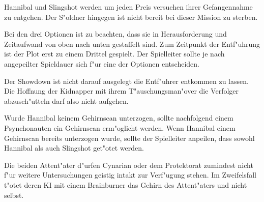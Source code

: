 Hannibal und Slingshot werden um jeden Preis versuchen ihrer Gefangennahme zu entgehen. Der S"oldner hingegen ist nicht bereit bei dieser Mission zu sterben.

\begin{remarks}
	Bei den drei Optionen ist zu beachten, dass sie in Herausforderung und Zeitaufwand von oben nach unten gestaffelt sind. Zum Zeitpunkt der Entf"uhrung ist der Plot erst zu einem Drittel gespielt. Der Spielleiter sollte je nach angepeilter Spieldauer sich f"ur eine der Optionen entscheiden.

	Der Showdown ist nicht darauf ausgelegt die Entf"uhrer entkommen zu lassen. Die Hoffnung der Kidnapper mit ihrem T"auschungsman"over
	die Verfolger abzusch"utteln darf also nicht aufgehen. 

	Wurde Hannibal keinem Gehirnscan unterzogen, sollte nachfolgend einem Psynchonauten ein Gehirnscan erm"oglicht werden. 
	Wenn Hannibal einem Gehirnscan bereits unterzogen wurde, sollte der Spielleiter anpeilen, dass sowohl Hannibal als auch Slingshot get"otet werden. 
	
	Die beiden Attent"ater d"urfen Cynarian oder dem Protektorat zumindest nicht f"ur weitere Untersuchungen
	geistig intakt zur Verf"ugung stehen. Im Zweifelsfall t"otet deren KI mit einem Brainburner das Gehirn des Attent"aters und nicht selbst.
\end{remarks}
